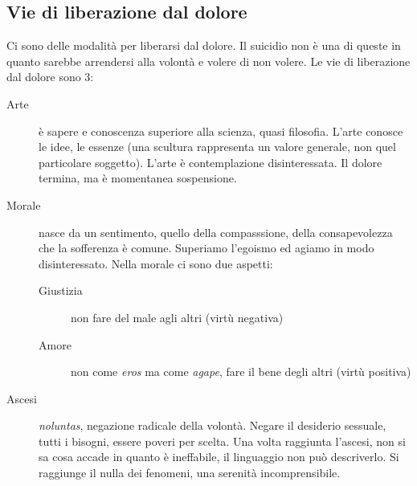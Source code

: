 \subsection{Vie di liberazione dal dolore}
Ci sono delle modalità per liberarsi dal dolore. Il suicidio non è una di queste in quanto sarebbe
arrendersi alla volontà e volere di non volere. Le vie di liberazione dal dolore sono 3:
\begin{description}
  \item[Arte] è sapere e conoscenza superiore alla scienza, quasi filosofia. L'arte conosce le idee,
    le essenze (una scultura rappresenta un valore generale, non quel particolare soggetto). L'arte
    è contemplazione disinteressata. Il dolore termina, ma è momentanea sospensione.
  \item[Morale] nasce da un sentimento, quello della compasssione, della consapevolezza che la 
    sofferenza è comune. Superiamo l'egoismo ed agiamo in modo disinteressato. Nella morale ci
    sono due aspetti:
    \begin{description}
      \item[Giustizia] non fare del male agli altri (virtù negativa)
      \item[Amore] non come \textit{eros} ma come \textit{agape}, fare il bene degli altri (virtù
        positiva)
    \end{description}
  \item[Ascesi] \textit{noluntas}, negazione radicale della volontà. Negare il desiderio sessuale,
    tutti i bisogni, essere poveri per scelta. Una volta raggiunta l'ascesi, non si sa cosa accade in
    quanto è ineffabile, il linguaggio non può descriverlo. Si raggiunge il nulla dei fenomeni,
    una serenità incomprensibile.
\end{description}
